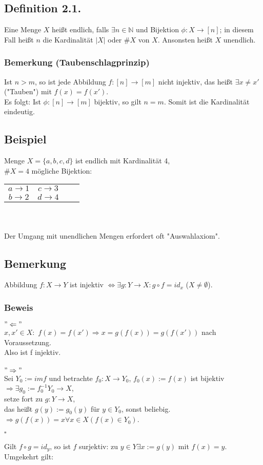 \documentclass[a4paper, 12pt]{extarticle}
\begin{document}
\subsection*{Definition 2.1.}
Eine Menge $X$ heißt endlich, falls $\exists n \in \mathbb{N}$ und Bijektion $\phi: X \rightarrow [n]$; in diesem Fall heißt $n$ die Kardinalität $|X|$ oder $\#X$ von $X$.
Ansonsten heißt $X$ unendlich. 
\subsubsection*{Bemerkung (Taubenschlagprinzip)}
Ist $n>m$, so ist jede Abbildung $f: [n] \rightarrow [m]$ nicht injektiv, das heißt $\exists x\neq x'$ ("Tauben") mit $f(x) = f(x')$. \\
Es folgt: Ist $\phi : [n] \rightarrow [m]$ bijektiv, so gilt $n=m$. Somit ist die Kardinalität eindeutig.

\subsection*{Beispiel}
Menge $X = \{a,b,c,d\}$ ist endlich mit Kardinalität 4, \\
$\#X =  4$ mögliche Bijektion: 
\begin{tabular}{cccc}
$a \rightarrow 1$ & $c \rightarrow 3$ \\
$b \rightarrow 2$ & $d \rightarrow 4$ \\
\end{tabular}
\\
\\
Der Umgang mit unendlichen Mengen erfordert oft "Auswahlaxiom".

\subsection*{Bemerkung}
Abbildung $f: X \rightarrow Y$ ist injektiv $\Leftrightarrow \exists g: Y \rightarrow X : g \circ f = id_x$ ($X \neq \emptyset $).
\subsubsection*{Beweis}
$"\Leftarrow"$ \\
$x,x' \in X :$
$f(x) = f(x') \Rightarrow  x = g(f(x)) = g(f(x'))$ nach Voraussetzung.\\
Also ist f injektiv. \\ 
\\
$"\Rightarrow"$\\
Sei $Y_0 := im f$ und betrachte $f_0 : X \rightarrow Y_0$, $f_0(x) := f(x)$ ist bijektiv \\
 $\Rightarrow \exists g_0 := f_0^{-1} Y_0 \rightarrow X$,\\
setze fort zu $g: Y \rightarrow X$,\\
das heißt $g(y) := g_0(y)$ für $y\in Y_0$, sonst beliebig.\\
$\Rightarrow g(f(x)) = x \forall  x \in X (f(x) \in Y_0)$.\\
\begin{flushright}
$\square$\\
\end{flushright}
Gilt $f \circ g = id_y$, so ist $f$ surjektiv: zu $y\in Y \exists x:= g(y)$ mit $f(x) = y$.\\
Umgekehrt gilt:
\end{document}
